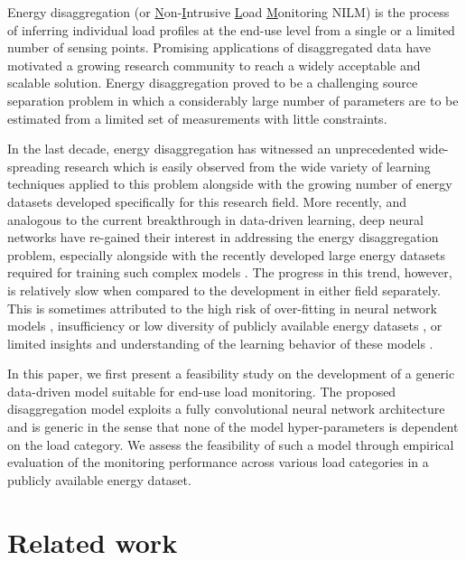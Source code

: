 \documentclass[twocolumn,letter,10pt]{IEEEtran} %
\begin{document}
Energy disaggregation (or \underline{N}on-\underline{I}ntrusive \underline{L}oad \underline{M}onitoring NILM) is the process of inferring individual load profiles at the end-use level from a single or a limited number of sensing points. Promising applications of disaggregated data have motivated a growing research community to reach a widely acceptable and scalable solution. Energy disaggregation  proved to be a challenging source separation problem in which a considerably large number of parameters are to be estimated from a limited set of measurements with little constraints.

In the last decade, energy disaggregation has witnessed an unprecedented wide-spreading research which is easily observed from the wide variety of learning techniques applied to this problem alongside with the growing number of energy datasets developed specifically for this research field. More recently, and analogous to the current breakthrough in data-driven learning, deep neural networks have re-gained their interest in addressing the energy disaggregation problem, especially alongside with the recently developed large energy datasets required for training such complex models \cite{Kaman_2017,Mauch_2015,Mauch_2016,Kelly_2015,Zhang_2016_SequenceToPointLearning,He_2016_AnEmpiricalStudy, Kelly_2015_UKDALE,Parson_2015_Dataport_NILMTK}. The progress in this trend, however, is relatively slow when compared to the development in either field separately. This is sometimes attributed to the high risk of over-fitting in neural network models \cite{Makonin_2014_PhD}, insufficiency or low diversity of publicly available energy datasets \cite{Kelly_2015}, or limited insights and understanding of the learning behavior of these models \cite{Zhang_2016_SequenceToPointLearning}.

In this paper, we first present a feasibility study on the development of a generic data-driven model suitable for end-use load monitoring. The proposed disaggregation model exploits a fully convolutional neural network architecture and is generic in the sense that none of the model hyper-parameters is dependent on the load category. We assess the feasibility of such a model through empirical evaluation of the monitoring performance across various load categories in a publicly available energy dataset. 



\section{Related work}
\label{sec:related-work}
\end{document}
